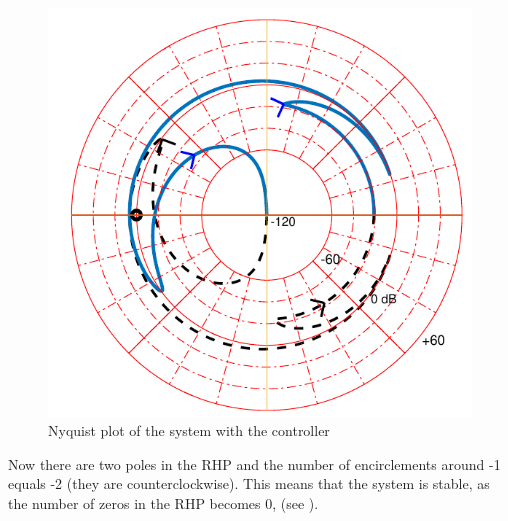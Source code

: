 \begin{figure}[H] 
	\centering 
	\includegraphics[scale=0.46]{figures/nyquistController}	
	\caption{Nyquist plot of the system with the controller}
\end{figure}	\label{nyquistController}

Now there are two poles in the RHP and the number of encirclements around -1 equals -2 (they are counterclockwise). 
This means that the system is stable, as the number of zeros in the RHP becomes 0, (see ).
